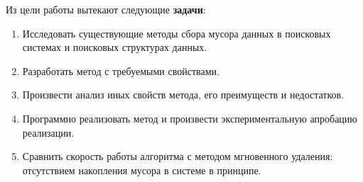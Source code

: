 Из цели работы вытекают следующие \textbf{задачи}:
\begin{enumerate}
    \item Исследовать существующие методы сбора мусора данных в поисковых системах
    и поисковых структурах данных.
    \item Разработать метод с требуемыми свойствами.
    \item Произвести анализ иных свойств метода, его преимуществ и недостатков.
    \item Программно реализовать метод и произвести экспериментальную апробацию реализации. 
    \item Сравнить скорость работы алгоритма с методом мгновенного удаления: отсутствием накопления
    мусора в системе в принципе.
\end{enumerate}